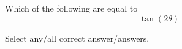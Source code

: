 \documentclass{ximera}
\author{Kenneth Berglund}
\begin{document}
\begin{exercise}

	Which of the following are equal to \[ \tan(2\theta) \]
	
	Select any/all correct answer/answers.
	\begin{selectAll}
	\end{selectAll}
	
\end{exercise}
\end{document}
